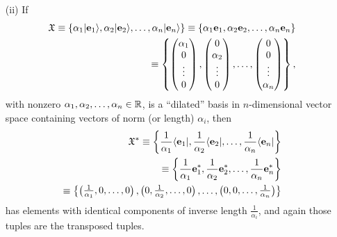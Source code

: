{\begin{itemize}
\item[(ii)]
If
\begin{equation}
\begin{split}
{\frak X}
\equiv
\{ \alpha_1 \vert {\bf e}_1 \rangle , \alpha_2 \vert  {\bf e}_2 \rangle ,\ldots ,\alpha_n \vert {\bf e}_n \rangle  \}
\equiv
\{\alpha_1 {\bf e}_1, \alpha_2 {\bf e}_2,\ldots ,\alpha_n {\bf e}_n\}
\\
\equiv
\left\{
\begin{pmatrix}
\alpha_1\\
0\\
\vdots \\
0
\end{pmatrix}
,
\begin{pmatrix}
0\\
\alpha_2\\
\vdots \\
0
\end{pmatrix}
,
\ldots ,
\begin{pmatrix}
0\\
0\\
\vdots \\
\alpha_n
\end{pmatrix}
\right\}
,
\end{split}
\end{equation}
with nonzero $\alpha_1,\alpha_2,\ldots ,\alpha_n \in {\Bbb R}$,
is a ``dilated'' basis in $n$-dimensional vector space containing vectors of norm (or length) $\alpha_i$,
then
\begin{equation}
\begin{split}
{\frak X}^*
\equiv
\left\{  \frac{1}{\alpha_1 }\langle {\bf e}_1 \vert ,\frac{1}{\alpha_2 } \langle  {\bf e}_2 \vert , \ldots ,\frac{1}{\alpha_n } \langle {\bf e}_n \vert \right\}
\\
\equiv
\left \{\frac{1}{\alpha_1 }{\bf e}_1^* ,\frac{1}{\alpha_2 }{\bf e}_2^*, \ldots ,\frac{1}{\alpha_n }{\bf e}_n^* \right\}
\\
\equiv
\left\{
\begin{pmatrix}\frac{1}{\alpha_1 },0,\ldots,0\end{pmatrix},
\begin{pmatrix}0,\frac{1}{\alpha_2 },\ldots,0\end{pmatrix},
\ldots,
\begin{pmatrix}0,0,\ldots,\frac{1}{\alpha_n }\end{pmatrix}\right\}
\end{split}
\end{equation}
has elements with identical components of inverse length $\frac{1}{\alpha_i }$,
and again those tuples are the transposed tuples.


\end{itemize}}
